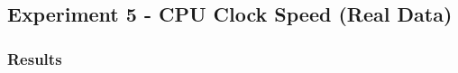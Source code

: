 \documentclass[../dissertation.tex]{subfiles}
\begin{document}
\subsection{Experiment 5 - CPU Clock Speed (Real Data)}



\subsubsection{Results}
\end{document}
